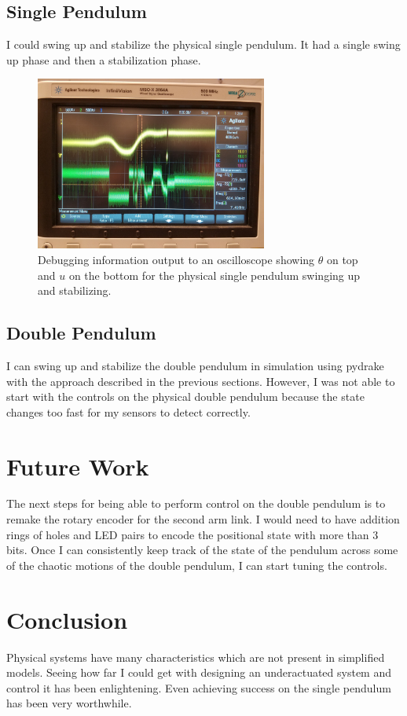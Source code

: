 \documentclass[conference]{IEEEtran}
\begin{document}
\subsection{Single Pendulum}
I could swing up and stabilize the physical single pendulum. It had a single swing up phase and then a stabilization phase.

\begin{figure}[ht]
	\centering
	\includegraphics[width=3in]{scope.jpg}
	\caption{Debugging information output to an oscilloscope showing $\theta$ on top and $u$ on the bottom for the physical single pendulum swinging up and stabilizing.}
	\label{fig:scope}
\end{figure}

\subsection{Double Pendulum}
I can swing up and stabilize the double pendulum in simulation using pydrake with the approach described in the previous sections. However, I was not able to start with the controls on the physical double pendulum because the state changes too fast for my sensors to detect correctly.

\section{Future Work}
The next steps for being able to perform control on the double pendulum is to remake the rotary encoder for the second arm link. I would need to have addition rings of holes and LED pairs to encode the positional state with more than 3 bits. Once I can consistently keep track of the state of the pendulum across some of the chaotic motions of the double pendulum, I can start tuning the controls.

\section{Conclusion}
Physical systems have many characteristics which are not present in simplified models. Seeing how far I could get with designing an underactuated system and control it has been enlightening. Even achieving success on the single pendulum has been very worthwhile.
\end{document}
